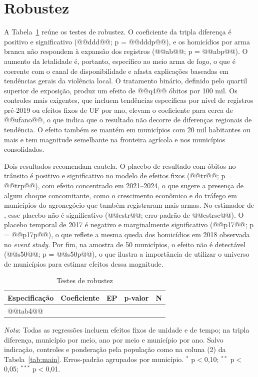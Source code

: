 \documentclass[11pt,a4paper]{article}
\newcommand{\nota}[1]{\par\vspace{2pt}\begin{minipage}{\linewidth}\footnotesize\textit{Nota}: #1\end{minipage}}
\begin{document}
\section{Robustez}\label{sec:robustez}

A Tabela~\ref{tab:rob} reúne os testes de robustez. O coeficiente da tripla diferença é positivo e significativo (@@ddd@@; p = @@dddp@@), e os homicídios por arma branca não respondem à expansão dos registros (@@ab@@; p = @@abp@@). O aumento da letalidade é, portanto, específico ao meio arma de fogo, o que é coerente com o canal de disponibilidade e afasta explicações baseadas em tendências gerais da violência local. O tratamento binário, definido pelo quartil superior de exposição, produz um efeito de @@q4@@ óbitos por 100 mil. Os controles mais exigentes, que incluem tendências específicas por nível de registros pré-2019 ou efeitos fixos de UF por ano, elevam o coeficiente para cerca de @@ufano@@, o que indica que o resultado não decorre de diferenças regionais de tendência. O efeito também se mantém em municípios com 20 mil habitantes ou mais e tem magnitude semelhante na fronteira agrícola e nos municípios consolidados.

Dois resultados recomendam cautela. O placebo de resultado com óbitos no trânsito é positivo e significativo no modelo de efeitos fixos (@@tr@@; p = @@trp@@), com efeito concentrado em 2021--2024, o que sugere a presença de algum choque concomitante, como o crescimento econômico e do tráfego em municípios do agronegócio que também registraram mais armas. No estimador de \citet{callaway2021}, esse placebo não é significativo (@@cstr@@; erro-padrão de @@cstrse@@). O placebo temporal de 2017 é negativo e marginalmente significativo (@@p17@@; p = @@p17p@@), o que reflete a mesma queda dos homicídios em 2018 observada no \textit{event study}. Por fim, na amostra de 50 municípios, o efeito não é detectável (@@s50@@; p = @@s50p@@), o que ilustra a importância de utilizar o universo de municípios para estimar efeitos dessa magnitude.

\begin{table}[H]
\centering\small
\caption{Testes de robustez}\label{tab:rob}
\begin{tabular}{lcccc}
\toprule
Especificação & Coeficiente & EP & p-valor & N \\
\midrule
@@tab4@@
\bottomrule
\end{tabular}
\nota{Todas as regressões incluem efeitos fixos de unidade e de tempo; na tripla diferença, município por meio, ano por meio e município por ano. Salvo indicação, controles e ponderação pela população como na coluna (2) da Tabela~\ref{tab:main}. Erros-padrão agrupados por município. $^{*}$ p$<$0,10; $^{**}$ p$<$0,05; $^{***}$ p$<$0,01.}
\end{table}
\end{document}
